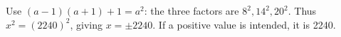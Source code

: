 Use $(a-1)(a+1)+1=a^2$: the three factors are $8^2,14^2,20^2$. Thus $x^2=(2240)^2$, giving $\boxed{x=\pm2240}$. If a positive value is intended, it is 2240.

